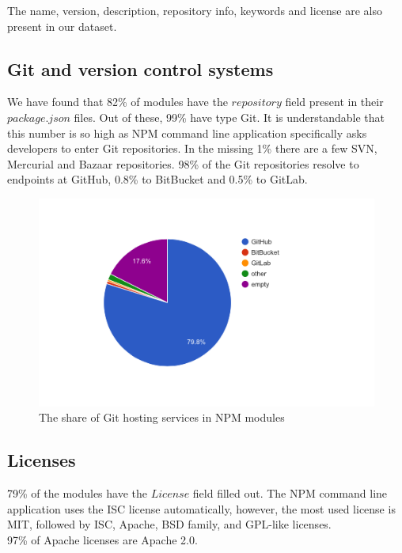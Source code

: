 \documentclass[thesis=M,english]{FITthesis}[2012/10/20]
\begin{document}
The name, version, description, repository info, keywords and license are also present in our dataset.


\subsection{Git and version control systems}

We have found that 82\% of modules have the $repository$ field present in their $package.json$ files. Out of these, 99\% have type Git. It is understandable that this number is so high as NPM command line application specifically asks developers to enter Git repositories. In the missing 1\% there are a few SVN, Mercurial and Bazaar repositories. 98\% of the Git repositories resolve to endpoints at GitHub, 0.8\% to BitBucket and 0.5\% to GitLab.

\begin{center}
\begin{figure}[h!]
	\includegraphics[totalheight=265pt]{images/npm_gits.png}
	\caption{The share of Git hosting services in NPM modules}
	\label{fig: npm_gits}
\end{figure}
\end{center}

\subsection{Licenses}

79\% of the modules have the $License$ field filled out. The NPM command line application uses the ISC license automatically, however, the most used license is MIT, followed by ISC, Apache, BSD family, and GPL-like licenses. \\

97\% of Apache licenses are Apache 2.0. \\
\end{document}
